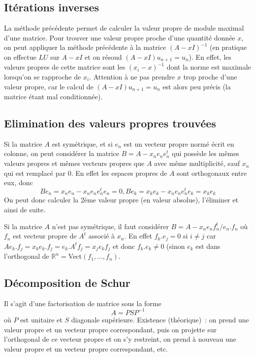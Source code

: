 \documentclass[a4paper,11pt]{book}
\begin{document}
\begin{giacjshere}
\subsection{Itérations inverses} 
La méthode précédente permet de calculer la valeur propre
de module maximal d'une matrice. Pour trouver une valeur
propre proche d'une quantité donnée $x$, on peut appliquer
la méthode précédente à la matrice $(A-xI)^{-1}$ (en pratique
on effectue $LU$ sur $A-xI$ et on résoud $(A-xI)u_{n+1}=u_n$). En effet,
les valeurs propres de cette matrice sont les $(x_i-x)^{-1}$ dont
la norme est maximale lorsqu'on se rapproche de $x_i$. Attention
à ne pas prendre $x$ trop proche d'une valeur propre, car le calcul
de $(A-xI)u_{n+1}=u_n$ est alors peu précis (la matrice étant
mal conditionnée).

\subsection{Elimination des valeurs propres trouvées}
Si la matrice $A$ est symétrique, et
si $e_n$ est un vecteur propre normé écrit en colonne, on peut considérer
la matrice $B=A-x_n e_n e_n^t$ qui possède les mêmes valeurs
propres et mêmes vecteurs propres que $A$ avec même multiplicité, 
sauf $x_n$ qui est remplacé par 0. 
En effet les espaces propres de $A$ sont orthogonaux
entre eux, donc
\[ Be_n=x_ne_n -x_n e_n e_n^t e_n = 0,
Be_k = x_k e_k - x_n e_n e_n^t e_k = x_k e_k\]
On peut donc calculer
la 2ème valeur propre (en valeur absolue), l'éliminer
et ainsi de suite.

Si la matrice $A$ n'est pas symétrique, il faut consid\'erer
$B=A-x_n e_n f_n^t /e_n.f_n$ o\`u $f_n$ est vecteur propre
de $A^t$ associ\'e \`a $x_n$. En effet $f_k.e_j=0$ si $i \neq j$
car $Ae_k.f_j=x_ke_k.f_j=e_k.A^tf_j=x_je_kf_j$ et donc $f_k.e_k \neq 0$
(sinon $e_k$ est dans l'orthogonal de $\mathbb{R}^n=$Vect$(f_1,...,f_n)$.


\subsection{D\'ecomposition de Schur}
Il s'agit d'une factorisation de matrice sous la forme
\[ A = P S P^{-1}\]
o\`u $P$ est unitaire et $S$ diagonale sup\'erieure.
Existence (th\'eorique)~: 
on prend une valeur propre et un vecteur propre correspondant,
puis on projette sur l'orthogonal de ce vecteur propre et on s'y
restreint, on prend \`a nouveau une valeur propre et un vecteur propre
correspondant, etc.


\end{giacjshere}
\end{document}
